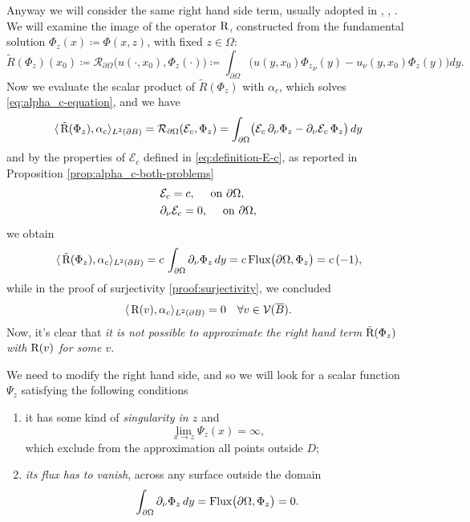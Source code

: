 \documentclass[10pt, a4paper, twoside, openright]{book}
\theoremstyle{definition}
\theoremstyle{plain}
\theoremstyle{plain}
\theoremstyle{plain}
\theoremstyle{plain}
\theoremstyle{plain}
\theoremstyle{plain}
\theoremstyle{plain}
\theoremstyle{plain}
\begin{document}
Anyway we will consider the same right hand side term, usually adopted in \cite{colton-haddar:rg}, \cite{dicristo-sun:2006}, \cite{dicristo-sun:2007}.
We will examine the image of the operator $\textup{R}$, constructed from the fundamental solution $\Phi_z(x)\coloneqq\Phi(x,z)$, with fixed $z\in\Omega$:
\begin{equation}
 \tilde{R}(\Phi_z)(x_0) \coloneqq \mathcal{R}_{\partial\Omega}\bigl(u(\cdot,x_0),\Phi_z(\cdot)\bigr)\coloneqq \int_{\partial \Omega}\bigl(u(y,x_0){\Phi_z}_\nu (y) - u_\nu(y,x_0)\Phi_z(y)\bigr)dy.
\end{equation}
Now we evaluate the scalar product of $\tilde{R}(\Phi_z)$ with $\alpha_{c}$, which solves \eqref{eq:alpha_c-equation}, and we have
\begin{equation}
 \langle \, \tilde{\textup{R}}(\Phi_z) ,\alpha_{c}\rangle_{L^2(\partial B)}=\mathcal{R}_{\partial \Omega}(\mathcal{E}_{c}, \Phi_z)=\int_{\partial\Omega}\bigl(\mathcal{E}_{c}\,\partial_\nu \Phi_z - \partial_\nu\mathcal{E}_{c}\, \Phi_z\bigr)\,dy
\end{equation}
and by the properties of $\mathcal{E}_{c}$ defined in \eqref{eq:definition-E-c}, as reported in Proposition \ref{prop:alpha_c-both-problems}
\begin{align}
 &\mathcal{E}_{c}=c, \quad\textup{ on }\partial\Omega,\\
 &\partial_\nu\mathcal{E}_{c}=0,\quad \textup{ on }\partial\Omega,
\end{align}
we obtain
\begin{equation}
 \langle \, \tilde{\textup{R}}(\Phi_z) ,\alpha_{c}\rangle_{L^2(\partial B)} = c\,\int_{\partial\Omega}\partial_\nu\Phi_z\,dy = c\,\textup{Flux}\bigl(\partial\Omega, \Phi_z\bigr) = c\,(-1),
\end{equation}
while in the proof of surjectivity \ref{proof:surjectivity}, we concluded 
\begin{equation}
 \langle \, \textup{R}(v) ,\alpha_{c}\rangle_{L^2(\partial B)}=0\quad \forall v\in\mathcal{V}(\overline{B}).
\end{equation}
Now, it's clear that \emph{it is not possible to approximate the right hand term $\tilde{\textup{R}}(\Phi_z)$ with $\textup{R}(v)$ for some $v$}.
\par
We need to modify the right hand side, and so we will look for a scalar function $\Psi_z$ satisfying the following conditions
\begin{enumerate}
 \item it has some kind of \emph{singularity in $z$} and 
 \begin{equation}
  \lim_{x\to z}\Psi_z(x) = \infty,\label{eq:condition-singularity}
 \end{equation}
  which exclude from the approximation all points outside $D$;
 \item \emph{its flux has to vanish}, across any surface outside the domain
 \begin{equation}
  \int_{\partial\Omega}\partial_\nu\Phi_z\,dy = \textup{Flux}\bigl(\partial\Omega, \Phi_z\bigr) = 0.\label{eq:condition-flux}
 \end{equation}
\end{enumerate}
\end{document}
